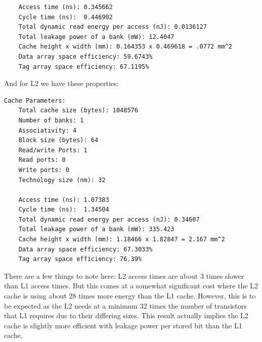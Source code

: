 \documentclass[a4paper, 11pt]{exam}
\begin{document}
\begin{enumerate}
\begin{enumerate}
\begin{verbatim}
    Access time (ns): 0.345662
    Cycle time (ns):  0.446902
    Total dynamic read energy per access (nJ): 0.0136127
    Total leakage power of a bank (mW): 12.4047
    Cache height x width (mm): 0.164353 x 0.469618 = .0772 mm^2
    Data array space efficiency: 59.6743%
    Tag array space efficiency: 67.1195%
\end{verbatim}
And for L2 we have these properties:
\begin{verbatim}
Cache Parameters:
    Total cache size (bytes): 1048576
    Number of banks: 1
    Associativity: 4
    Block size (bytes): 64
    Read/write Ports: 1
    Read ports: 0
    Write ports: 0
    Technology size (nm): 32

    Access time (ns): 1.07383
    Cycle time (ns):  1.34504
    Total dynamic read energy per access (nJ): 0.34607
    Total leakage power of a bank (mW): 335.423
    Cache height x width (mm): 1.18466 x 1.82847 = 2.167 mm^2
    Data array space efficiency: 67.3033%
    Tag array space efficiency: 76.39%
\end{verbatim}
There are a few things to note here: L2 access times are about 3 times slower
than L1 access times. But this comes at a somewhat significant cost where the
L2 cache is using about 28 times more energy than the L1 cache. However, this is
to be expected as the L2 needs at a minimum 32 times the number of
transistors that L1 requires due to their differing sizes. This result actually
implies the L2 cache is slightly more efficient with leakage power per stored
bit than the L1 cache.


\end{enumerate}
\end{enumerate}
\end{document}
